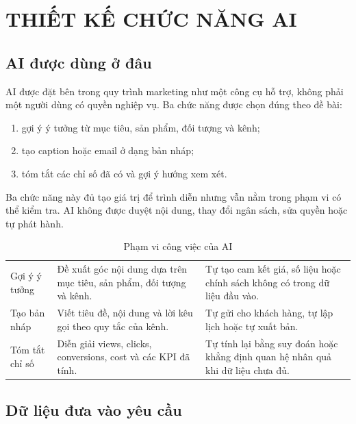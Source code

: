 \chapter{THIẾT KẾ CHỨC NĂNG AI}

\section{AI được dùng ở đâu}

AI được đặt bên trong quy trình marketing như một công cụ hỗ trợ, không phải một người dùng có quyền nghiệp vụ. Ba chức năng được chọn đúng theo đề bài:

\begin{enumerate}
\item gợi ý ý tưởng từ mục tiêu, sản phẩm, đối tượng và kênh;
\item tạo caption hoặc email ở dạng bản nháp;
\item tóm tắt các chỉ số đã có và gợi ý hướng xem xét.
\end{enumerate}

Ba chức năng này đủ tạo giá trị để trình diễn nhưng vẫn nằm trong phạm vi có thể kiểm tra. AI không được duyệt nội dung, thay đổi ngân sách, sửa quyền hoặc tự phát hành.

\begin{table}[h!]
\centering
\small
\caption{Phạm vi công việc của AI}
\label{tab:v8-ai-scope}
\begin{tabularx}{\textwidth}{|L{3.0cm}|Y|Y|}
\hline
{} &  & \\
\hline
Gợi ý ý tưởng & Đề xuất góc nội dung dựa trên mục tiêu, sản phẩm, đối tượng và kênh. & Tự tạo cam kết giá, số liệu hoặc chính sách không có trong dữ liệu đầu vào.\\
\hline
Tạo bản nháp & Viết tiêu đề, nội dung và lời kêu gọi theo quy tắc của kênh. & Tự gửi cho khách hàng, tự lập lịch hoặc tự xuất bản.\\
\hline
Tóm tắt chỉ số & Diễn giải views, clicks, conversions, cost và các KPI đã tính. & Tự tính lại bằng suy đoán hoặc khẳng định quan hệ nhân quả khi dữ liệu chưa đủ.\\
\hline
\end{tabularx}
\end{table}

\section{Dữ liệu đưa vào yêu cầu}

